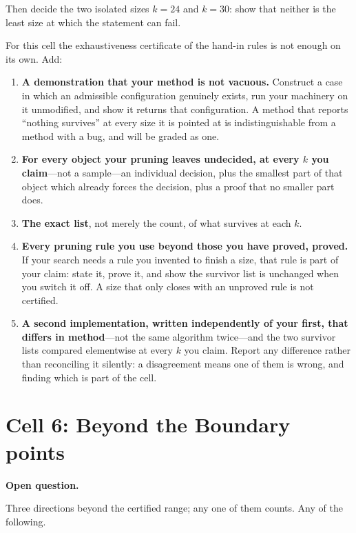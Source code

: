 \documentclass[11pt]{article}
\theoremstyle{definition}
\newcommand{\cell}[3]{%
  \section*{Cell #1: #2\hfill{\normalsize\mdseries #3}}}
\begin{document}
Then decide the two isolated sizes $k = 24$ and $k = 30$: show that
neither is the least size at which the statement can fail.

For this cell the exhaustiveness certificate of the hand-in rules is
not enough on its own. Add:

\begin{enumerate}[label=(\roman*), leftmargin=*]
  \item \textbf{A demonstration that your method is not vacuous.}
    Construct a case in which an admissible configuration genuinely
    exists, run your machinery on it unmodified, and show it returns
    that configuration. A method that reports ``nothing survives'' at
    every size it is pointed at is indistinguishable from a method
    with a bug, and will be graded as one.
  \item \textbf{For every object your pruning leaves undecided, at
    every $k$ you claim}---not a sample---an individual decision, plus
    the smallest part of that object which already forces the
    decision, plus a proof that no smaller part does.
  \item \textbf{The exact list}, not merely the count, of what
    survives at each $k$.
  \item \textbf{Every pruning rule you use beyond those you have
    proved, proved.}
    If your search needs a rule you invented to finish a size, that
    rule is part of your claim: state it, prove it, and show the
    survivor list is unchanged when you switch it off. A size that
    only closes with an unproved rule is not certified.
  \item \textbf{A second implementation, written independently of
    your first, that differs in method}---not the same algorithm
    twice---and the two survivor lists compared elementwise at every
    $k$ you claim. Report any difference rather than reconciling it
    silently: a disagreement means one of them is wrong, and finding
    which is part of the cell.
\end{enumerate}

\cell{6}{Beyond the Boundary}{13 points}

\textbf{Open question.}

Three directions beyond the certified range; any one of them counts.
Any of the following.
\end{document}
